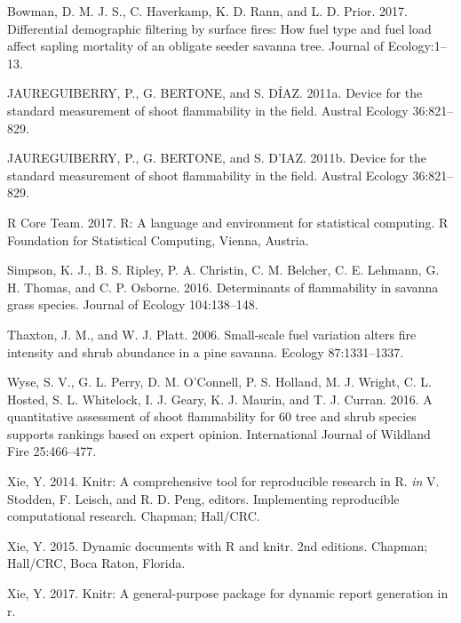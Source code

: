 \documentclass[11pt,a4paper]{article}
\begin{document}
\leavevmode\hypertarget{ref-Bowman2017}{}%
Bowman, D. M. J. S., C. Haverkamp, K. D. Rann, and L. D. Prior. 2017.
Differential demographic filtering by surface fires: How fuel type and
fuel load affect sapling mortality of an obligate seeder savanna tree.
Journal of Ecology:1--13.

\leavevmode\hypertarget{ref-JAUREGUIBERRY2011}{}%
JAUREGUIBERRY, P., G. BERTONE, and S. DÍAZ. 2011a. Device for the
standard measurement of shoot flammability in the field. Austral Ecology
36:821--829.

\leavevmode\hypertarget{ref-JAUREGUIBERRY_2011}{}%
JAUREGUIBERRY, P., G. BERTONE, and S. D\a'IAZ. 2011b. Device for the
standard measurement of shoot flammability in the field. Austral Ecology
36:821--829.

\leavevmode\hypertarget{ref-R_Core_Team_2017}{}%
R Core Team. 2017. R: A language and environment for statistical
computing. R Foundation for Statistical Computing, Vienna, Austria.

\leavevmode\hypertarget{ref-Simpson2016}{}%
Simpson, K. J., B. S. Ripley, P. A. Christin, C. M. Belcher, C. E.
Lehmann, G. H. Thomas, and C. P. Osborne. 2016. Determinants of
flammability in savanna grass species. Journal of Ecology 104:138--148.

\leavevmode\hypertarget{ref-Thaxton2006}{}%
Thaxton, J. M., and W. J. Platt. 2006. Small-scale fuel variation alters
fire intensity and shrub abundance in a pine savanna. Ecology
87:1331--1337.

\leavevmode\hypertarget{ref-Wyse2016}{}%
Wyse, S. V., G. L. Perry, D. M. O'Connell, P. S. Holland, M. J. Wright,
C. L. Hosted, S. L. Whitelock, I. J. Geary, K. J. Maurin, and T. J.
Curran. 2016. A quantitative assessment of shoot flammability for 60
tree and shrub species supports rankings based on expert opinion.
International Journal of Wildland Fire 25:466--477.

\leavevmode\hypertarget{ref-Xie_2014}{}%
Xie, Y. 2014. Knitr: A comprehensive tool for reproducible research in
R. \emph{in} V. Stodden, F. Leisch, and R. D. Peng, editors.
Implementing reproducible computational research. Chapman; Hall/CRC.

\leavevmode\hypertarget{ref-Xie_2015}{}%
Xie, Y. 2015. Dynamic documents with R and knitr. 2nd editions. Chapman;
Hall/CRC, Boca Raton, Florida.

\leavevmode\hypertarget{ref-Xie_2017}{}%
Xie, Y. 2017. Knitr: A general-purpose package for dynamic report
generation in r.
\end{document}
